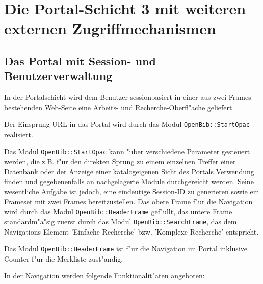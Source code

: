 \documentclass[11pt, twoside, a4paper, BCOR8mm, DIV12, bibtotoc,idxtotoc]{scrbook}
\begin{document}
\section{Die Portal-Schicht 3 mit weiteren externen Zugriffmechanismen}

\subsection{Das Portal mit Session- und Benutzerverwaltung}

In der Portalschicht wird dem Benutzer sessionbasiert in einer aus
zwei Frames bestehenden Web-Seite eine Arbeits- und Recherche-Oberfl"ache
geliefert. 

Der Einsprung-URL in das Portal wird durch das Modul
\texttt{OpenBib::StartOpac} realisiert.

Das Modul \texttt{OpenBib::StartOpac} kann "uber verschiedene
Parameter gesteuert werden, die z.B. f"ur den direkten Sprung zu einem
einzelnen Treffer einer Datenbank oder der Anzeige einer
katalogeigenen Sicht des Portals Verwendung finden und gegebenenfalls
an nachgelagerte Module durchgereicht werden. Seine wesentliche
Aufgabe ist jedoch, eine eindeutige Session-ID zu generieren sowie ein
Frameset mit zwei Frames bereitzustellen.  Das obere Frame f"ur die
Navigation wird durch das Modul \texttt{OpenBib::HeaderFrame}
gef"ullt, das untere Frame standardm"a"sig zuerst durch das Modul
\texttt{OpenBib::SearchFrame}, das dem Navigations-Element 'Einfache
Recherche' bzw. 'Komplexe Recherche' entspricht.

Das Modul \texttt{OpenBib::HeaderFrame} ist f"ur die Navigation im Portal
inklusive Counter f"ur die Merkliste zust"andig.

In der Navigation werden folgende Funktionalit"aten angeboten:
\end{document}
